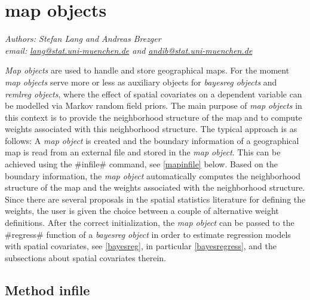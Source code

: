 \chapter{map objects}
\label{map} 


{\em Authors: Stefan Lang and Andreas Brezger} \\
{\em email: \href{mailto:lang@stat.uni-muenchen.de}{lang@stat.uni-muenchen.de} and \href{mailto:andib@stat.uni-muenchen.de}{andib@stat.uni-muenchen.de}}\\
\vspace{0.3cm}


{\em Map objects} are used to handle and store geographical maps.
For the moment {\em map objects} serve more or less as auxiliary
objects for {\em bayesreg objects} and {\em remlreg objects},
where the effect of spatial covariates on a dependent variable can
be modelled via Markov random field priors. The main purpose of
{\em map objects} in this context is to provide the neighborhood
structure of the map and to compute weights associated with this
neighborhood structure. The typical approach is as follows: A {\em
map object} is created and the boundary information of a
geographical map is read from an external file and stored in the
{\em map object}. This can be achieved using the #infile# command,
see \autoref{mapinfile} below. Based on the boundary information,
the {\em map object} automatically computes the neighborhood structure
of the map and the weights associated with the neighborhood
structure. Since there are several proposals in the spatial
statistics literature for defining the weights, the user is given
the choice between a couple of alternative weight definitions.
After the correct initialization, the {\em map object} can be
passed to the #regress# function of a {\em bayesreg object} in
order to estimate regression models with spatial covariates, see
\autoref{bayesreg}, in particular \autoref{bayesregress}, and the
subsections about spatial covariates therein.



\clearpage



\section{Method infile}
\label{mapinfile}    
 

